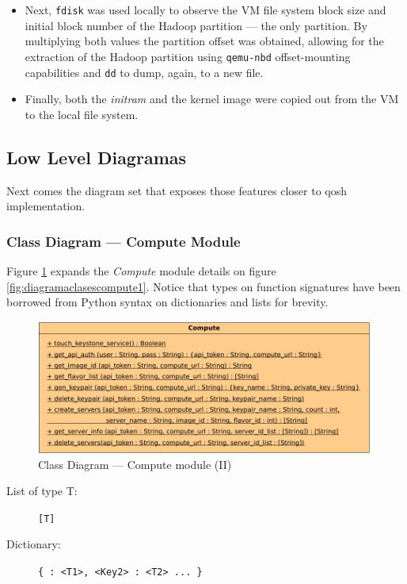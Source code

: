 \begin{itemize}
 \item Next, \texttt{fdisk} was used locally to observe the VM file system block size and initial block number of the Hadoop partition --- the only partition. By multiplying both values the partition offset was obtained, allowing for the extraction of the Hadoop partition using \texttt{qemu-nbd} offset-mounting capabilities and \texttt{dd} to dump, again, to a new file.
 \item Finally, both the \emph{initram} and the kernel image were copied out from the VM to the local file system.
\end{itemize}

\subsection{Low Level Diagramas}\label{subsec:diagramasimpl}
\noindent Next comes the diagram set that exposes those features closer to qosh implementation.

\subsubsection{Class Diagram --- Compute Module}\label{subsubsec:implementacioncompute}
\noindent Figure \ref{fig:diagramaclasescompute2} expands the \emph{Compute} module details on figure \ref{fig:diagramaclasescompute1}. Notice that types on function signatures have been borrowed from Python syntax on dictionaries and lists for brevity.

\begin{figure}[tbp]
\begin{center}
\includegraphics[width=0.99\textwidth]{imagenes/028.pdf}
 \caption{Class Diagram --- Compute module (II)}
\label{fig:diagramaclasescompute2}
\end{center}
\end{figure}

\begin{description}
 \item[List of type T:] \texttt{[T]}
 \item[Dictionary:] \texttt{\{<Key1> : <T1>, <Key2> : <T2> ... \}}
\end{description}

